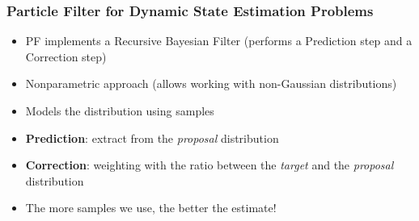 \begin{frame}
    \frametitle{Particle Filter for Dynamic State Estimation Problems}
    
    \begin{itemize}
        \item PF implements a Recursive Bayesian Filter (performs a Prediction step and a Correction step)
        \item Nonparametric approach (allows working with non-Gaussian distributions)
        \item Models the distribution using samples
        \item \textbf{Prediction}: extract from the \emph{proposal} distribution
        \item \textbf{Correction}: weighting with the ratio between the \emph{target} and the \emph{proposal} distribution
        \item \alert{The more samples we use, the better the estimate!}
    \end{itemize}
\end{frame}


